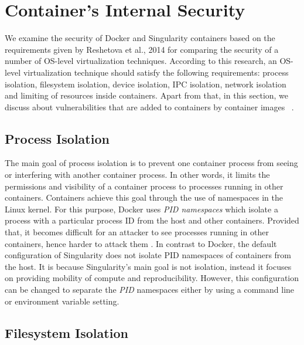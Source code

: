 \section{Container's Internal Security}

We examine the security of Docker and Singularity containers
based on the requirements given
by Reshetova et al., 2014 \cite{reshetova2014security} for comparing
the security of a number of OS-level virtualization techniques.
According to this research, an OS-level virtualization technique should
satisfy the following requirements: process isolation, filesystem isolation,
device isolation, IPC isolation, network isolation and limiting
of resources inside containers. Apart from that, in this section, we discuss about vulnerabilities
that are added to containers by container images ~\cite{cappos2008look, gummaraju2015over}.

\subsection{Process Isolation}

The main goal of process isolation is to prevent one container process
from seeing or interfering with another container process. In other words,
it limits the permissions and visibility of a container process to
processes running in other containers. Containers achieve this goal
through the use of namespaces in the Linux kernel. For this purpose,
Docker uses \textit{PID namespaces} which isolate a process with a
particular process ID from the host and other containers. Provided
that, it becomes difficult for an attacker to see processes running
in other containers, hence harder to attack them \cite{bui2015analysis}.
In contrast to Docker, the default configuration of Singularity does
not isolate PID namespaces of containers from the host.
It is because Singularity's main goal is not isolation, instead it
focuses on providing mobility of compute and reproducibility.
However, this configuration can be changed to separate the \textit{PID}
namespaces either by using a command line or environment variable setting.

\subsection{Filesystem Isolation}

